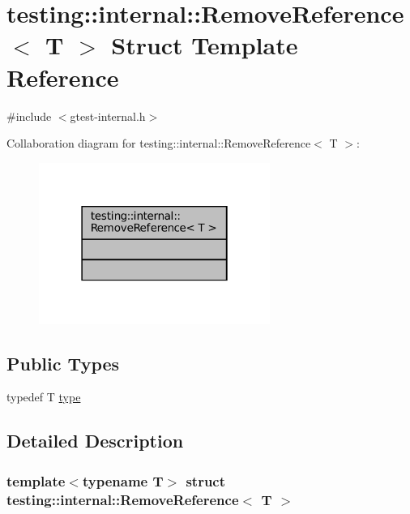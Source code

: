 \hypertarget{structtesting_1_1internal_1_1RemoveReference}{}\section{testing\+:\+:internal\+:\+:Remove\+Reference$<$ T $>$ Struct Template Reference}
\label{structtesting_1_1internal_1_1RemoveReference}


{\ttfamily \#include $<$gtest-\/internal.\+h$>$}



Collaboration diagram for testing\+:\+:internal\+:\+:Remove\+Reference$<$ T $>$\+:
\nopagebreak
\begin{figure}[H]
\begin{center}
\leavevmode
\includegraphics[width=214pt]{structtesting_1_1internal_1_1RemoveReference__coll__graph}
\end{center}
\end{figure}
\subsection*{Public Types}
\begin{DoxyCompactItemize}
\item 
typedef T \hyperlink{structtesting_1_1internal_1_1RemoveReference_a9ca4f6499579225f7986b789ee4b2895}{type}
\end{DoxyCompactItemize}


\subsection{Detailed Description}
\subsubsection*{template$<$typename T$>$\newline
struct testing\+::internal\+::\+Remove\+Reference$<$ T $>$}



